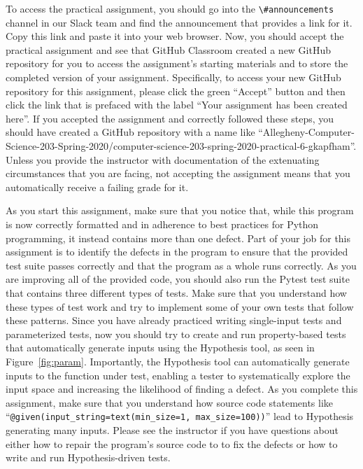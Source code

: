 \documentclass[11pt]{article}
\newcommand{\command}[1]{``\lstinline{#1}''}
\newcommand{\channel}[1]{\lstinline{#1}}
\begin{document}
To access the practical assignment, you should go into the
\channel{\#announcements} channel in our Slack team and find the announcement
that provides a link for it. Copy this link and paste it into your web browser.
Now, you should accept the practical assignment and see that GitHub Classroom
created a new GitHub repository for you to access the assignment's starting
materials and to store the completed version of your assignment. Specifically,
to access your new GitHub repository for this assignment, please click the green
``Accept'' button and then click the link that is prefaced with the label ``Your
assignment has been created here''. If you accepted the assignment and correctly
followed these steps, you should have created a GitHub repository with a name
like
``Allegheny-Computer-Science-203-Spring-2020/computer-science-203-spring-2020-practical-6-gkapfham''.
Unless you provide the instructor with documentation of the extenuating
circumstances that you are facing, not accepting the assignment means that you
automatically receive a failing grade for it.

As you start this assignment, make sure that you notice that, while this program
is now correctly formatted and in adherence to best practices for Python
programming, it instead contains more than one defect.
%
Part of your job for this assignment is to identify the defects in the program
to ensure that the provided test suite passes correctly and that the program as
a whole runs correctly.
%
As you are improving all of the provided code, you should also run the Pytest
test suite that contains three different types of tests. Make sure that you
understand how these types of test work and try to implement some of your own
tests that follow these patterns.
%
Since you have already practiced writing single-input tests and parameterized
tests, now you should try to create and run property-based tests that
automatically generate inputs using the Hypothesis tool, as seen in
Figure~\ref{fig:param}.
%
Importantly, the Hypothesis tool can automatically generate inputs to the
function under test, enabling a tester to systematically explore the input space
and increasing the likelihood of finding a defect.
%
As you complete this assignment, make sure that you understand how source code
statements like \command{@given(input_string=text(min_size=1, max_size=100))}
lead to Hypothesis generating many inputs.
%
Please see the instructor if you have questions about either how to repair the
program's source code to to fix the defects or how to write and run
Hypothesis-driven tests.
\end{document}

